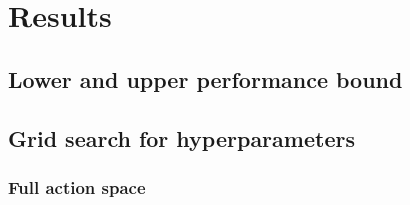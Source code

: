 \chapter{Results}
\label{ch:results}

\section{Lower and upper performance bound}

\section{Grid search for hyperparameters}



\subsection{Full action space}

